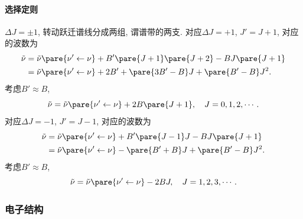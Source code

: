 \documentclass[hidelinks]{ctexart}
\begin{document}
\paragraph{选择定则} %
\label{par:选择定则}

$\Delta J = \pm 1$, 转动跃迁谱线分成两组, 谓谱带的两支. 对应$\Delta J = +1$, $J' = J+1$, 对应的波数为
\begin{align*}
    \tilde{\nu} &= \tilde{\nu}\pare{\nu' \leftarrow \nu} + B'\pare{J+1}\pare{J+2} - BJ\pare{J+1} \\
    &= \tilde{\nu}\pare{\nu' \leftarrow \nu} + 2B' + \pare{3B' - B}J + \pare{B' - B}J^2.
\end{align*}
考虑$B' \approx B$,
\[ \tilde{\nu} = \tilde{\nu}\pare{\nu' \leftarrow \nu} + 2B\pare{J+1},\quad J = 0,1,2,\cdots. \]
对应$\Delta J = -1$, $J' = J-1$, 对应的波数为
\begin{align*}
    \tilde{\nu} &= \tilde{\nu}\pare{\nu' \leftarrow \nu} + B'\pare{J-1}J - BJ\pare{J+1} \\
    &= \tilde{\nu}\pare{\nu' \leftarrow \nu} - \pare{B' + B}J + \pare{B' - B}J^2.
\end{align*}
考虑$B' \approx B$,
\[ \tilde{\nu} = \tilde{\nu}\pare{\nu' \leftarrow \nu} - 2BJ,\quad J = 1,2,3,\cdots. \]



\subsubsection{电子结构} %
\label{ssub:电子结构}
\end{document}
